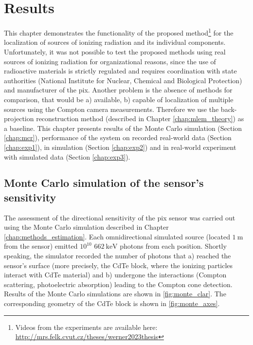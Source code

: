 
\chapter{Results\label{chap:results}}
This chapter demonstrates the functionality of the proposed method\footnote{Videos from the experiments are available here: \url{http://mrs.felk.cvut.cz/theses/werner2023thesis}} for the localization of sources of ionizing radiation and its individual components.
Unfortunately, it was not possible to test the proposed methods using real sources of ionizing radiation for organizational reasons, since the use of radioactive materials is strictly regulated and requires coordination with state authorities (National Institute for Nuclear, Chemical and Biological Protection) and manufacturer of the \ac{pix}.
Another problem is the absence of methods for comparison, that would be a) available, b) capable of localization of multiple sources using the Compton camera measurements.
Therefore we use the back-projection reconstruction method (described in Chapter \ref{chap:mlem_theory}) as a baseline.
This chapter presents results of the Monte Carlo simulation (Section \ref{chap:mcr}), 
performance of the system on recorded real-world data (Section \ref{chap:exp1}), 
in simulation (Section \ref{chap:exp2}) and in real-world experiment with simulated data (Section \ref{chap:exp3}). 

\section{Monte Carlo simulation of the sensor's sensitivity\label{chap:mcr}}
The assessment of the directional sensitivity of the \ac{pix} sensor was carried out using the Monte Carlo simulation described in Chapter \ref{chap:methods_estimation}.
Each omnidirectional simulated source (located $\SI{1}{\meter}$ from the sensor) emitted $10^{10}$ $\SI{662}{\kilo\electronvolt}$ photons from each position.
Shortly speaking, the simulator recorded the number of photons that a) reached the sensor's surface (more precisely, the \ac{CdTe} block, where the ionizing particles interact with \ac{CdTe} material) and b) undergone the interactions (Compton scattering, photoelectric absorption) leading to the Compton cone detection.  
Results of the Monte Carlo simulations are shown in \autoref{fig:monte_clar}.
The corresponding geometry of the \ac{CdTe} block is shown in \autoref{fig:monte_axes}.

